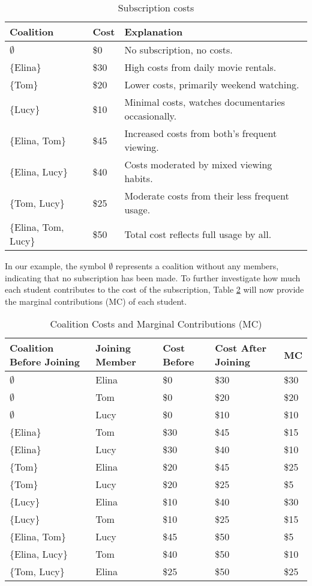\documentclass[12pt]{article}
\begin{document}
	\begin{table}[htbp]
		\centering
		\caption{Subscription costs}
		\begin{tabular}{lll}
			\toprule
			Coalition & Cost & Explanation \\
			\midrule
			$\emptyset$ & \$0 & No subscription, no costs. \\
			\{Elina\} & \$30 & High costs from daily movie rentals. \\
			\{Tom\} & \$20 & Lower costs, primarily weekend watching. \\
			\{Lucy\} & \$10 & Minimal costs, watches documentaries occasionally. \\
			\{Elina, Tom\} & \$45 & Increased costs from both's frequent viewing. \\
			\{Elina, Lucy\} & \$40 & Costs moderated by mixed viewing habits. \\
			\{Tom, Lucy\} & \$25 & Moderate costs from their less frequent usage. \\
			\{Elina, Tom, Lucy\} & \$50 & Total cost reflects full usage by all. \\
			\bottomrule
		\end{tabular}%
		\label{tab:subscription_costs}%
	\end{table}%
	In our example, the symbol $\emptyset$ represents a coalition without any members, indicating that no subscription has been made. To further investigate how much each student contributes to the cost of the subscription, Table \ref{tab:coalition_costs} will now provide the marginal contributions (MC) of each student.
	\begin{table}[htbp]
		\centering
		\caption{Coalition Costs and Marginal Contributions (MC)}
		\begin{tabular}{lllll}
			\toprule
			Coalition Before Joining & Joining Member & Cost Before & Cost After Joining & MC \\
			\midrule
			$\emptyset$ & Elina & \$0 & \$30 & \$30 \\
			$\emptyset$ & Tom & \$0 & \$20 & \$20 \\
			$\emptyset$ & Lucy & \$0 & \$10 & \$10 \\
			\{Elina\} & Tom & \$30 & \$45 & \$15 \\
			\{Elina\} & Lucy & \$30 & \$40 & \$10 \\
			\{Tom\} & Elina & \$20 & \$45 & \$25 \\
			\{Tom\} & Lucy & \$20 & \$25 & \$5 \\
			\{Lucy\} & Elina & \$10 & \$40 & \$30 \\
			\{Lucy\} & Tom & \$10 & \$25 & \$15 \\
			\{Elina, Tom\} & Lucy & \$45 & \$50 & \$5 \\
			\{Elina, Lucy\} & Tom & \$40 & \$50 & \$10 \\
			\{Tom, Lucy\} & Elina & \$25 & \$50 & \$25 \\
			\bottomrule
		\end{tabular}%
		\label{tab:coalition_costs}%
	\end{table}%
\end{document}
